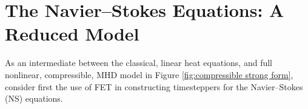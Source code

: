 \section{The Navier--Stokes Equations: A Reduced Model}\label{cha:Navier--Stokes}
    As an intermediate between the classical, linear heat equations, and full nonlinear, compressible, MHD model in Figure \ref{fig:compressible strong form}, consider first the use of FET in constructing timesteppers for the Navier--Stokes (NS) equations.


    
    